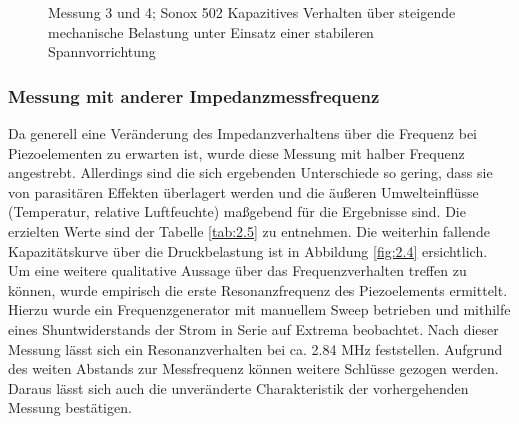 \documentclass[12pt]{scrreprt} %
\begin{document}
\begin {figure}[htbp]
      \begin{center}
      \end{center}
\caption[Messung 3 und 4; Sonox 502 unter Einsatz besserer Spannvorrichtung]{Messung 3 und 4; Sonox 502 Kapazitives Verhalten über steigende mechanische Belastung unter Einsatz einer stabileren Spannvorrichtung}
\label{fig:2.3}
\end{figure}
\newpage
\subsubsection{Messung mit anderer Impedanzmessfrequenz}
Da generell eine Veränderung des Impedanzverhaltens über die Frequenz bei Piezoelementen zu erwarten ist, wurde diese Messung mit halber Frequenz angestrebt. Allerdings sind die sich ergebenden Unterschiede so gering, dass sie von parasitären Effekten überlagert werden und die äußeren Umwelteinflüsse (Temperatur, relative Luftfeuchte) maßgebend für die Ergebnisse sind. Die erzielten Werte sind der Tabelle \vref{tab:2.5} zu entnehmen. Die weiterhin fallende Kapazitätskurve über die Druckbelastung ist in Abbildung \vref{fig:2.4} ersichtlich.\\
Um eine weitere qualitative Aussage über das Frequenzverhalten treffen zu können, wurde empirisch die erste Resonanzfrequenz des Piezoelements ermittelt. Hierzu wurde ein Frequenzgenerator mit manuellem Sweep betrieben und mithilfe eines Shuntwiderstands der Strom in Serie auf Extrema beobachtet. Nach dieser Messung lässt sich ein Resonanzverhalten bei ca. 2.84 MHz feststellen. Aufgrund des weiten Abstands zur Messfrequenz können weitere Schlüsse gezogen werden. Daraus lässt sich auch die unveränderte Charakteristik der vorhergehenden Messung bestätigen.
\end{document}
